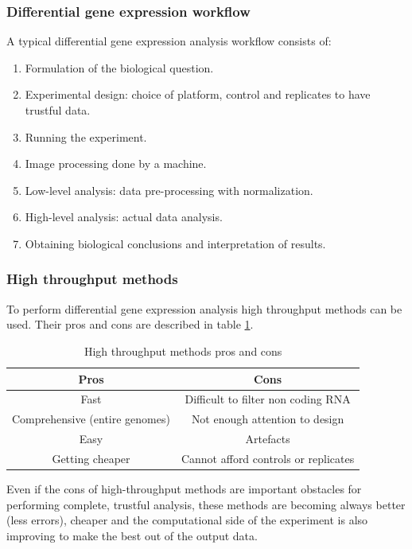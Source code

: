 		\subsubsection{Differential gene expression workflow}
		A typical differential gene expression analysis workflow consists of:

		\begin{multicols}{2}
			\begin{enumerate}
				\item Formulation of the biological question.
				\item Experimental design: choice of platform, control and replicates to have trustful data.
				\item Running the experiment.
				\item Image processing done by a machine.
				\item Low-level analysis: data pre-processing with normalization.
				\item High-level analysis: actual data analysis.
				\item Obtaining biological conclusions and interpretation of results.
			\end{enumerate}
		\end{multicols}

		\subsubsection{High throughput methods}
		To perform differential gene expression analysis high throughput methods can be used.
		Their pros and cons are described in table \ref{tab:high-through-dge}.

		\begin{table}[H]
			\centering
			\begin{tabular}{|c|c|}
				\hline
				Pros & Cons\\
				\hline
				Fast & Difficult to filter non coding RNA\\
				Comprehensive (entire genomes) & Not enough attention to design\\
				Easy & Artefacts\\
				Getting cheaper & Cannot afford controls or replicates\\
				\hline
			\end{tabular}
			\caption{High throughput methods pros and cons}
			\label{tab:high-through-dge}
		\end{table}

		Even if the cons of high-throughput methods are important obstacles for performing complete, trustful analysis, these methods are becoming always better (less errors), cheaper and the computational side of the experiment is also improving to make the best out of the output data.


